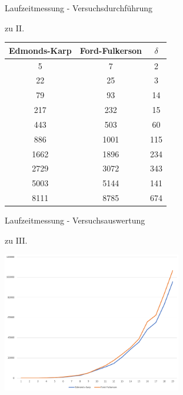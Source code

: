 \documentclass{beamer}
\begin{document}
    \begin{frame}{Laufzeitmessung - Versuchsdurchf\"uhrung}
        \begin{block}{zu II.}
            \begin{center}
                \begin{tabular}{c|c|c}
                    \textbf{Edmonds-Karp} & \textbf{Ford-Fulkerson} & $\delta$\\
                    \hline
                    5 & 7 & 2\\
                    22 & 25 & 3\\
                    79 & 93 & 14\\
                    217 & 232 & 15\\
                    443 & 503 & 60\\
                    886 & 1001 & 115\\
                    1662 & 1896 & 234\\
                    2729 & 3072 & 343\\
                    5003 & 5144 & 141\\
                    8111 & 8785 & 674\\
                \end{tabular}
            \end{center}
        \end{block}
    \end{frame}

    \begin{frame}{Laufzeitmessung - Versuchsauswertung}
        \begin{block}{zu III.}
            \begin{center}
                \includegraphics[width=7.8cm]{../auswertung.PNG}
            \end{center}
        \end{block}
    \end{frame}
\end{document}
